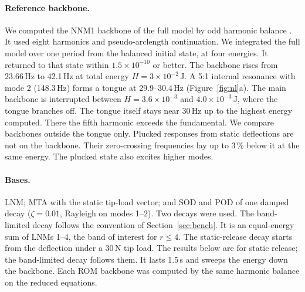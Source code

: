 \documentclass[preprint,12pt]{elsarticle}
\begin{document}
\paragraph{Reference backbone.} We computed the NNM1 backbone \citep{Kerschen2009} of the full model by odd harmonic balance \citep{Detroux2015}. It used eight harmonics and pseudo-arclength continuation.
We integrated the full model over one period from the balanced initial state, at four energies. It returned to that state within $1.5\times10^{-10}$ or better.
The backbone rises from 23.66\,Hz to 42.1\,Hz at total energy $H=3\times10^{-2}$\,J.
A 5:1 internal resonance with mode 2 (148.3\,Hz) forms a tongue at 29.9--30.4\,Hz (Figure~\ref{fig:nl}a). The main backbone is interrupted between $H=3.6\times10^{-3}$ and $4.0\times10^{-3}$\,J, where the tongue branches off. The tongue itself stays near 30\,Hz up to the highest energy computed.
There the fifth harmonic exceeds the fundamental. We compare backbones outside the tongue only.
Plucked responses from static deflections are not on the backbone. Their zero-crossing frequencies lay up to 3\,\% below it at the same energy. The plucked state also excites higher modes.

\paragraph{Bases.} LNM; MTA with the static tip-load vector; and SOD and POD of one damped decay ($\zeta=0.01$, Rayleigh on modes 1--2). Two decays were used. The band-limited decay follows the convention of Section~\ref{sec:bench}. It is an equal-energy sum of LNMs 1--4, the band of interest for $r\le4$. The static-release decay starts from the deflection under a 30\,N tip load. The results below are for static release; the band-limited decay follows them. It lasts 1.5\,s and sweeps the energy down the backbone.
Each ROM backbone was computed by the same harmonic balance on the reduced equations.
\end{document}
